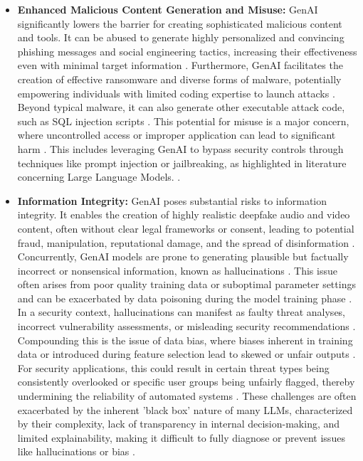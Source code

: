 \begin{itemize}
    \item \textbf{Enhanced Malicious Content Generation and Misuse:} GenAI significantly lowers the barrier for creating sophisticated malicious content and tools. It can be abused to generate highly personalized and convincing phishing messages and social engineering tactics, increasing their effectiveness even with minimal target information \cite{nyoto_cyber_2024}. Furthermore, GenAI facilitates the creation of effective ransomware and diverse forms of malware, potentially empowering individuals with limited coding expertise to launch attacks \cite{nyoto_cyber_2024}. Beyond typical malware, it can also generate other executable attack code, such as SQL injection scripts \cite{nyoto_cyber_2024}. This potential for misuse is a major concern, where uncontrolled access or improper application can lead to significant harm \cite{surathunmanun_exploring_2024}. This includes leveraging GenAI to bypass security controls through techniques like prompt injection or jailbreaking, as highlighted in literature concerning Large Language Models. \cite{surathunmanun_exploring_2024}.

    \item \textbf{Information Integrity:} GenAI poses substantial risks to information integrity. It enables the creation of highly realistic deepfake audio and video content, often without clear legal frameworks or consent, leading to potential fraud, manipulation, reputational damage, and the spread of disinformation \cite{nyoto_cyber_2024}. Concurrently, GenAI models are prone to generating plausible but factually incorrect or nonsensical information, known as hallucinations \cite{nyoto_cyber_2024, surathunmanun_exploring_2024}. This issue often arises from poor quality training data or suboptimal parameter settings \cite{surathunmanun_exploring_2024} and can be exacerbated by data poisoning during the model training phase \cite{nyoto_cyber_2024}. In a security context, hallucinations can manifest as faulty threat analyses, incorrect vulnerability assessments, or misleading security recommendations \cite{surathunmanun_exploring_2024}. Compounding this is the issue of data bias, where biases inherent in training data or introduced during feature selection lead to skewed or unfair outputs \cite{surathunmanun_exploring_2024}. For security applications, this could result in certain threat types being consistently overlooked or specific user groups being unfairly flagged, thereby undermining the reliability of automated systems \cite{surathunmanun_exploring_2024}. These challenges are often exacerbated by the inherent 'black box' nature of many LLMs, characterized by their complexity, lack of transparency in internal decision-making, and limited explainability, making it difficult to fully diagnose or prevent issues like hallucinations or bias \cite{dash_zero-trust_2024}.


\end{itemize}
